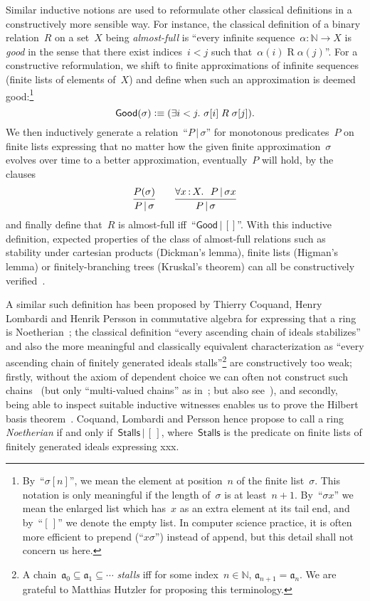 \documentclass[envcountsect,envcountsame,runningheads]{llncs}
\newcommand{\aaa}{\mathfrak{a}}
\newcommand{\NN}{\mathbb{N}}
\newcommand{\defeqv}{\vcentcolon\equiv}
\renewcommand{\_}{\mathpunct{.}\,}
\newcommand{\?}{\,{:}\,}
\begin{document}
Similar inductive notions are used to reformulate other classical definitions
in a constructively more sensible way. For instance, the classical definition
of a binary relation~$R$ on a set~$X$ being \emph{almost-full} is ``every
infinite sequence~$\alpha : \NN \to X$ is \emph{good} in the sense that there
exist indices~$i < j$ such that~$\alpha(i) \mathrel{R} \alpha(j)$''.
For a constructive reformulation, we shift to finite approximations of
infinite sequences (finite lists of elements of~$X$) and define when such an
approximation is deemed good:\footnote{By~``$\sigma[n]$'', we mean the element
at position~$n$ of the finite list~$\sigma$. This notation is only meaningful
if the length of~$\sigma$ is at least~$n+1$. By~``$\sigma x$'' we mean the
enlarged list which has~$x$ as an extra element at its tail end, and by~``$[\,]$'' we
denote the empty list. In computer science practice, it is often more efficient
to prepend (``$x \sigma$'') instead of append, but this detail shall not
concern us here.}
\[ \mathsf{Good}(\sigma) \defeqv (\exists i<j\_ \sigma[i] \mathrel{R} \sigma[j]). \]
We then inductively generate a relation~``$P \,|\, \sigma$'' for monotonous
predicates~$P$ on finite lists expressing that no matter how the given finite
approximation~$\sigma$ evolves over time to a better approximation,
eventually~$P$ will hold, by the clauses
\[
  \infer{P \,|\, \sigma}{P(\sigma)}
  \qquad
  \infer{P \,|\, \sigma}{\forall x \? X\_\ P \,|\, \sigma x}
\]
and finally define that~$R$ is almost-full iff~``$\mathsf{Good} \,|\, []$''.
With this inductive definition, expected properties of the class of almost-full
relations such as stability under cartesian products (Dickman's lemma),
finite lists (Higman's lemma) or finitely-branching trees (Kruskal's theorem)
can all be constructively verified~\cite{xxx}.

A similar such definition has been proposed by Thierry Coquand, Henry Lombardi and Henrik Persson in commutative
algebra for expressing that a ring is Noetherian~\cite{coquand-persson:groebner,coquand-lombardi:krull,coquand:invariant}; the classical
definition ``every ascending chain of ideals stabilizes'' and also the more
meaningful and classically equivalent characterization as ``every ascending
chain of finitely generated ideals stalls''\footnote{A chain~$\aaa_0 \subseteq
\aaa_1 \subseteq \cdots$ \emph{stalls} iff for some index~$n \in \NN$,
$\aaa_{n+1} = \aaa_n$. We are grateful to Matthias Hutzler for proposing this
terminology.} are constructively too weak; firstly, without the axiom of
dependent choice we can often not construct such chains~\cite{richman:noetherian} (but only
``multi-valued chains'' as in~\cite[Section~3.9]{blechschmidt:phd}; but also
see~\cite[Section~4]{richman:noetherian}), and secondly, being able to inspect suitable inductive
witnesses enables us to prove the Hilbert basis theorem~\cite[Corollary~16]{coquand-persson:groebner}. Coquand, Lombardi and Persson
hence propose to call a ring \emph{Noetherian} if and only if~$\mathsf{Stalls}
\,|\, [\,]$, where~$\mathsf{Stalls}$ is the predicate on finite lists of finitely
generated ideals expressing xxx.
\end{document}
